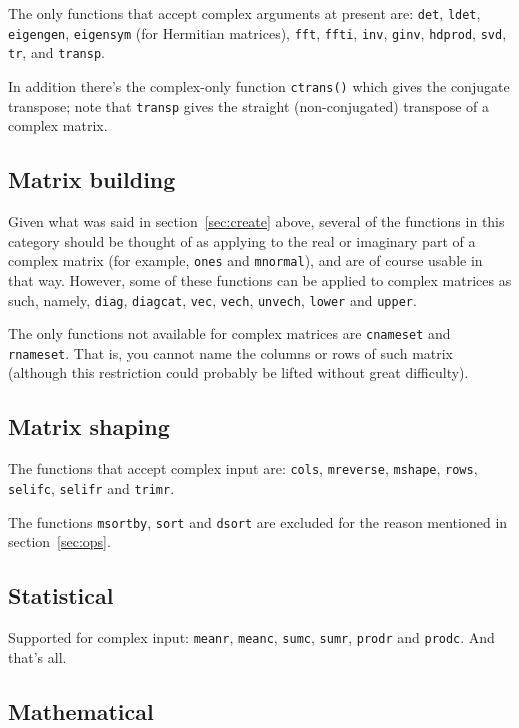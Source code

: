 \documentclass{article}
\begin{document}
The only functions that accept complex arguments at present are:
\texttt{det}, \texttt{ldet}, \texttt{eigengen}, \texttt{eigensym} (for
Hermitian matrices), \texttt{fft}, \texttt{ffti}, \texttt{inv},
\texttt{ginv}, \texttt{hdprod}, \texttt{svd}, \texttt{tr}, and
\texttt{transp}.

In addition there's the complex-only function \texttt{ctrans()} which
gives the conjugate transpose; note that \texttt{transp} gives the
straight (non-conjugated) transpose of a complex matrix.

\subsection{Matrix building}

Given what was said in section~\ref{sec:create} above, several of the
functions in this category should be thought of as applying to the
real or imaginary part of a complex matrix (for example, \texttt{ones}
and \texttt{mnormal}), and are of course usable in that way.  However,
some of these functions can be applied to complex matrices as such,
namely, \texttt{diag}, \texttt{diagcat}, \texttt{vec}, \texttt{vech},
\texttt{unvech}, \texttt{lower} and \texttt{upper}.

The only functions not available for complex matrices are
\texttt{cnameset} and \texttt{rnameset}. That is, you cannot name the
columns or rows of such matrix (although this restriction could
probably be lifted without great difficulty).

\subsection{Matrix shaping}

The functions that accept complex input are: \texttt{cols},
\texttt{mreverse}, \texttt{mshape}, \texttt{rows}, \texttt{selifc},
\texttt{selifr} and \texttt{trimr}.

The functions \texttt{msortby}, \texttt{sort} and \texttt{dsort} are
excluded for the reason mentioned in section~\ref{sec:ops}.

\subsection{Statistical}

Supported for complex input: \texttt{meanr}, \texttt{meanc},
\texttt{sumc}, \texttt{sumr}, \texttt{prodr} and \texttt{prodc}. And
that's all.

\subsection{Mathematical}
\end{document}

